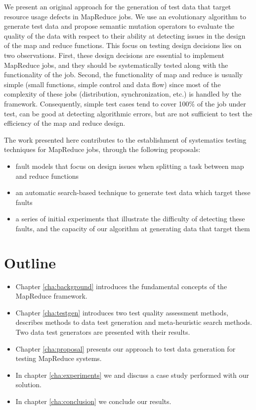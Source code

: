 We present an original approach for the generation of test data that target resource usage defects in MapReduce jobs. We use an evolutionary algorithm to generate test data and propose semantic mutation operators to evaluate the quality of the data with respect to their ability at detecting issues in the design of the map and reduce functions. This focus on testing design decisions lies on two observations. First, these design decisions are essential to implement MapReduce jobs, and they should be systematically tested along with the functionality of the job. Second, the functionality of map and reduce is usually simple (small functions, simple control and data flow) since most of the complexity of these jobs (distribution, synchronization, etc.) is handled by the framework. Consequently, simple test cases tend to cover 100\% of the job under test, can be good at detecting algorithmic errors, but are not sufficient to test the efficiency of the map and reduce design. 

The work presented here contributes to the establishment of systematics testing techniques for MapReduce jobs, through the following proposals:
\begin{itemize}
	\item fault models that focus on design issues when splitting a task between map and reduce functions
	\item an automatic search-based technique to generate test data which target these faults
	\item a series of initial experiments that illustrate the difficulty of detecting these faults, and the capacity of our algorithm at generating data that target them
\end{itemize} 

\section{Outline}

\begin{itemize}
	\item Chapter \ref{cha:background} introduces the  fundamental concepts of the MapReduce framework.
	\item Chapter \ref{cha:testgen} introduces two test quality assessment methods, describes methods to data test generation and 
	      meta-heuristic search methods. Two data test generators are presented with their results.
	\item Chapter \ref{cha:proposal} presents our approach to test data generation for testing MapReduce systems.
	\item In chapter \ref{cha:experiments} we and discuss a case study performed with our solution.
	\item In chapter \ref{cha:conclusion} we conclude our results.
\end{itemize}

